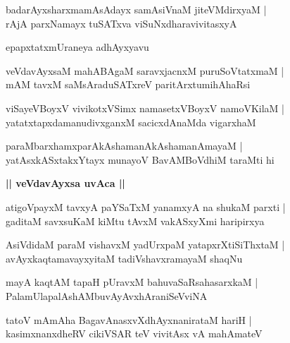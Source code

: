 \documentclass[twoside,12pt,openright]{book}
\newcounter{shloka}[chapter]
\def\uvaca#1{\centerline{{\large\textbf{#1}}}}
\begin{document}
\begin{shloka}%
badarAyxsharxmamAsAdayx samAsiVnaM jiteVMdirxyaM |\\
rAjA parxNamayx tuSATxva viSuNxdharavivitasxyA 
\end{shloka}

\begin{center}
epapxtatxmUraneya adhAyxyavu
\end{center}

\begin{shloka}%
veVdavAyxsaM mahABAgaM saravxjacnxM puruSoVtatxmaM |\\
mAM  tavxM saMsAraduSATxreV paritArxtumihAhaRsi 
\end{shloka}

\begin{shloka}%
viSayeVBoyxV vivikotxVSimx namasetxVBoyxV namoVKilaM |\\
yatatxtapxdamanudivxganxM sacicxdAnaMda vigarxhaM 
\end{shloka}

\begin{shloka}%
paraMbarxhamxparAkAshamanAkAshamanAmayaM |\\
yatAsxkASxtakxYtayx munayoV BavAMBoVdhiM taraMti hi 
\end{shloka}

\uvaca{|| veVdavAyxsa uvAca ||}

\begin{shloka}%
atigoVpayxM tavxyA paYSaTxM yanamxyA na shukaM parxti |\\
gaditaM savxsuKaM kiMtu tAvxM  vakASxyXmi haripirxya 
\end{shloka}

\begin{shloka}%
AsiVdidaM paraM vishavxM yadUrxpaM yatapxrXtiSiThxtaM |\\
avAyxkaqtamavayxyitaM tadiVshavxramayaM shaqNu
\end{shloka}

\begin{shloka}%
mayA kaqtAM tapaH pUravxM bahuvaSaRsahasarxkaM |\\
PalamUlapalAshAMbuvAyAvxhAraniSeVviNA 
\end{shloka}

\begin{shloka}%
tatoV mAmAha BagavAnasxvXdhAyxnanirataM hariH |\\
kasimxnanxdheRV cikiVSAR teV vivitAsx vA mahAmateV 
\end{shloka}
\end{document}
